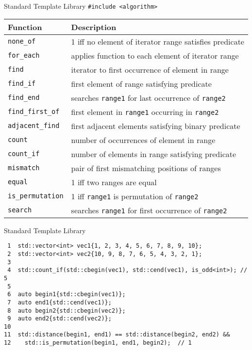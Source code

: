 \documentclass[presentation]{beamer}
\begin{document}
\begin{frame}[label={sec:org6801dfe},fragile]{Standard Template Library}
 \texttt{\#include <algorithm>}
\begin{center}
\begin{tabular}{ll}
Function & Description\\
\hline
\texttt{none\_of} & 1 iff no element of iterator range satisfies predicate\\
\texttt{for\_each} & applies function to each element of iterator range\\
\texttt{find} & iterator to first occurrence of element in range\\
\texttt{find\_if} & first element of range satisfying predicate\\
\texttt{find\_end} & searches \texttt{range1} for last occurrence of \texttt{range2}\\
\texttt{find\_first\_of} & first element in \texttt{range1} occurring in \texttt{range2}\\
\texttt{adjacent\_find} & first adjacent elements satisfying binary predicate\\
\texttt{count} & number of occurrences of element in range\\
\texttt{count\_if} & number of elements in range satisfying predicate\\
\texttt{mismatch} & pair of first mismatching positions of ranges\\
\texttt{equal} & 1 iff two ranges are equal\\
\texttt{is\_permutation} & 1 iff \texttt{range1} is permutation of \texttt{range2}\\
\texttt{search} & searches \texttt{range1} for first occurrence of \texttt{range2}\\
\end{tabular}
\end{center}
\end{frame}
\begin{frame}[label={sec:orgfd326c7},fragile]{Standard Template Library}
 \begin{verbatim}
 1  std::vector<int> vec1{1, 2, 3, 4, 5, 6, 7, 8, 9, 10};
 2  std::vector<int> vec2{10, 9, 8, 7, 6, 5, 4, 3, 2, 1};
 3  
 4  std::count_if(std::cbegin(vec1), std::cend(vec1), is_odd<int>); // 5
 5  
 6  auto begin1{std::cbegin(vec1)};
 7  auto end1{std::cend(vec1)};
 8  auto begin2{std::cbegin(vec2)};
 9  auto end2{std::cend(vec2)};
10  
11  std::distance(begin1, end1) == std::distance(begin2, end2) &&
12    std::is_permutation(begin1, end1, begin2);  // 1
\end{verbatim}
\end{frame}
\end{document}
